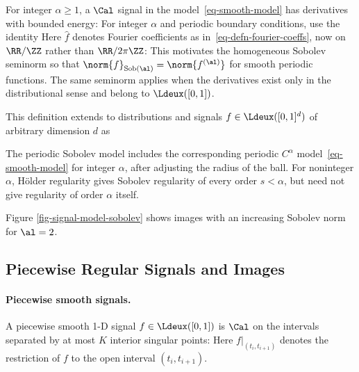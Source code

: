 For integer $\alpha\geq1$, a $\Cal$ signal in the model~\eqref{eq-smooth-model} has derivatives with bounded energy:
For integer $\alpha$ and periodic boundary conditions, use the identity
Here $\hat f$ denotes Fourier coefficients as in~\eqref{eq-defn-fourier-coeffs}, now on $\RR/\ZZ$ rather than $\RR/2\pi\ZZ$:
This motivates the homogeneous Sobolev seminorm
so that $\norm{f}_{\text{Sob}(\al)} = \norm{f^{(\al)}}$ for smooth periodic functions. The same seminorm applies when the derivatives exist only in the distributional sense and belong to $\Ldeux([0,1])$.

This definition extends to distributions and signals $f \in \Ldeux([0,1]^d)$ of arbitrary dimension $d$ as

The periodic Sobolev model
includes the corresponding periodic $C^\alpha$ model~\eqref{eq-smooth-model} for integer $\alpha$, after adjusting the radius of the ball. For noninteger $\alpha$, H\"older regularity gives Sobolev regularity of every order $s<\alpha$, but need not give regularity of order $\alpha$ itself.

Figure \ref{fig-signal-model-sobolev} shows images with an increasing Sobolev norm for $\al=2$.



                                           
\subsection{Piecewise Regular Signals and Images}

  
\paragraph{Piecewise smooth signals.}

A piecewise smooth 1-D signal $f \in \Ldeux([0,1])$ is $\Cal$ on the intervals separated by at most $K$ interior singular points:
Here $f|_{(t_i,t_{i+1})}$ denotes the restriction of $f$ to the open interval $(t_i,t_{i+1})$.


